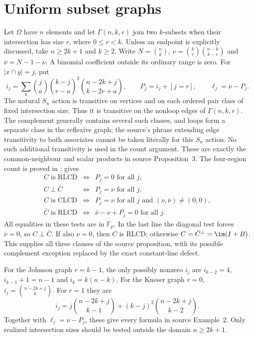 \section{Uniform subset graphs}
Let $\Omega$ have $n$ elements and let $\Gamma(n,k,r)$ join two
$k$-subsets when their intersection has size $r$, where $0\leq r<k$.
Unless an endpoint is explicitly discussed, take $n\geq2k+1$ and
$k\geq2$. Write $N=\binom nk$, $\nu=\binom kr\binom{n-k}{k-r}$ and
$\bar\nu=N-1-\nu$. A binomial coefficient outside its ordinary range
is zero. For $|x\cap y|=j$, put
\[
 i_j=\sum_a\binom ja\binom{k-j}{r-a}^{\!2}
              \binom{n-2k+j}{k-2r+a},\qquad
 P_j=i_j+[j=r],\qquad \ell_j=\nu-P_j.
\]
The natural $S_n$ action is transitive on vertices and on each ordered
pair class of fixed intersection size. Thus it is transitive on the
nonloop edges of $\Gamma(n,k,r)$. The complement generally contains
several such classes, and loops form a separate class in the reflexive
graph; the source's phrase extending edge transitivity to both associates
cannot be taken literally for this $S_n$ action. No such additional
transitivity is used in the count argument.
These are exactly the common-neighbour and scalar products in source
Proposition~3. The four-region count is proved in
;  gives
\begin{equation}\label{eq:subset-tests}
\begin{array}{rcl}
 C\text{ is RLCD}&\Longleftrightarrow&P_j=0\text{ for all }j,\\
 C\perp\bar C&\Longleftrightarrow&P_j=\nu\text{ for all }j,\\
 C\text{ is CLCD}&\Longleftrightarrow&P_j=\nu\text{ for all }j
                      \text{ and }(\nu,\bar\nu)\ne(0,0),\\
 \bar C\text{ is RLCD}&\Longleftrightarrow&\bar\nu-\nu+P_j=0
                      \text{ for all }j.
\end{array}
\end{equation}
All equalities in these tests are in $\mathbb F_p$. In the last line the
diagonal test forces $\bar\nu=0$, so $C\perp\bar C$. If also $\nu=0$,
then $C$ is RLCD; otherwise $C=\bar C^\perp=\im(I+B)$.
This supplies all three clauses of the source proposition, with its
possible complement exception replaced by the exact constant-line defect.

For the Johnson graph $r=k-1$, the only possibly nonzero $i_j$ are
$i_{k-2}=4$, $i_{k-1}+1=n-1$ and $i_k=k(n-k)$.
For the Kneser graph $r=0$, $i_j=\binom{n-2k+j}{k}$.
For $r=1$ they are
\[
 i_j=j\binom{n-2k+j}{k-1}+(k-j)^2\binom{n-2k+j}{k-2}.
\]
Together with $\ell_j=\nu-P_j$, these give every formula in source
Example~2. Only realized intersection sizes should be tested outside
the domain $n\geq2k+1$.

